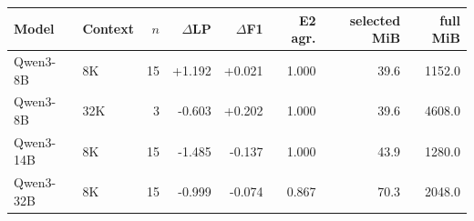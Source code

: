 \begin{tabular}{llrrrrrr}
\toprule
Model & Context & $n$ & $\Delta$LP & $\Delta$F1 & E2 agr. & selected MiB & full MiB \\
\midrule
Qwen3-8B & 8K & 15 & +1.192 & +0.021 & 1.000 & 39.6 & 1152.0 \\
Qwen3-8B & 32K & 3 & -0.603 & +0.202 & 1.000 & 39.6 & 4608.0 \\
Qwen3-14B & 8K & 15 & -1.485 & -0.137 & 1.000 & 43.9 & 1280.0 \\
Qwen3-32B & 8K & 15 & -0.999 & -0.074 & 0.867 & 70.3 & 2048.0 \\
\bottomrule
\end{tabular}
